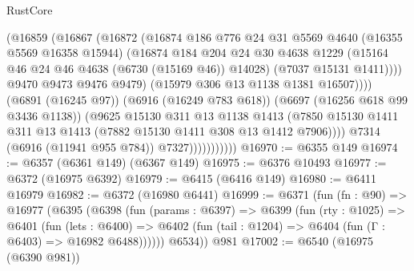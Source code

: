 \begin{lexlean}{RustCore}
\begin{coremodule}
                                (@16859
                                  (@16867
                                    (@16872
                                      (@16874
                                        @186
                                        @776
                                        @24
                                        @31
                                        @5569
                                        @4640
                                        (@16355 @5569 @16358 @15944)
                                        (@16874
                                          @184
                                          @204
                                          @24
                                          @30
                                          @4638
                                          @1229
                                          (@15164 @46 @24 @46 @4638 (@6730 (@15169 @46)) @14028)
                                          (@7037 @15131 @1411))))
                                    @9470
                                    @9473
                                    @9476
                                    @9479)
                                  (@15979 @306 @13 @1138 @1381 @16507))))
                            (@6891 (@16245 @97))
                            (@6916 (@16249 @783 @618))
                            (@6697 (@16256 @618 @99 @3436 @1138))
                            (@9625
                              @15130
                              @311
                              @13
                              @1138
                              @1413
                              (@7850
                                @15130
                                @1411
                                @311
                                @13
                                @1413
                                (@7882 @15130 @1411 @308 @13 @1412 @7906))))
                          @7314
                          (@6916 (@11941 @955 @784))
                          @7327)))))))))))
@16970 := @6355 @149
@16974 := @6357 (@6361 @149) (@6367 @149)
@16975 := @6376 @10493
@16977 := @6372 (@16975 @6392)
@16979 := @6415 (@6416 @149)
@16980 := @6411 @16979
@16982 := @6372 (@16980 @6441)
@16999 := @6371
    (fun (fn : @90) =>
    @16977
      (@6395
        (@6398
          (fun (params : @6397) =>
          @6399
            (fun (rty : @1025) =>
            @6401
              (fun (lets : @6400) =>
              @6402 (fun (tail : @1204) => @6404 (fun (Γ : @6403) => @16982 @6488))))))
        @6534))
    @981
@17002 := @6540 (@16975 (@6390 @981))

\end{coremodule}
\end{lexlean}
